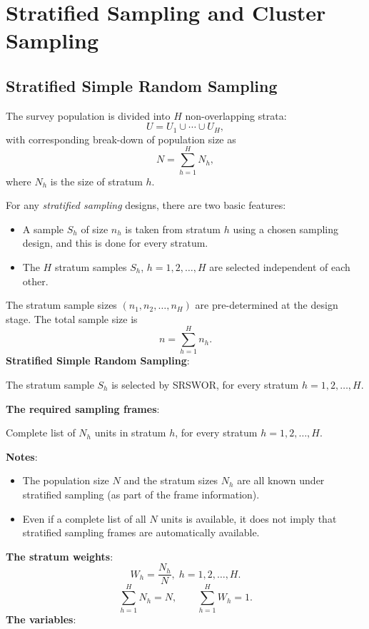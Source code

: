 \chapter{Stratified Sampling and Cluster Sampling}
\section{Stratified Simple Random Sampling}
The survey population is divided into $H$ non-overlapping strata:
\[ U=U_1\cup \cdots \cup U_H, \]
with corresponding break-down of population size as
\[ N=\sum_{h=1}^{H}N_h, \]
where $ N_h $ is the size of stratum $ h $.

For any \emph{stratified sampling} designs, there are two basic features:
\begin{itemize}
      \item A sample $ S_h $ of size $ n_h $ is taken from stratum $ h $ using
            a chosen sampling design, and this is done for every stratum.
      \item The $ H $ stratum samples $ S_h $, $ h=1,2,\ldots,H $ are selected
            independent of each other.
\end{itemize}

The stratum sample sizes $ (n_1,n_2,\ldots,n_H) $ are pre-determined
at the design stage. The total sample size is
\[ n=\sum_{h=1}^{H}n_h. \]
\textbf{Stratified Simple Random Sampling}:

The stratum sample $ S_h $ is selected by SRSWOR, for every stratum $ h=1,2,\ldots,H $.

\textbf{The required sampling frames}:

Complete list of $ N_h $ units in stratum $ h $, for every stratum $ h=1,2,\ldots,H $.

\textbf{Notes}:
\begin{itemize}
      \item The population size $ N $ and the stratum sizes $ N_h $ are
            all known under stratified sampling (as part of the frame information).
      \item Even if a complete list of all $N$ units is available, it does not
            imply that stratified sampling frames are automatically available.
\end{itemize}

\textbf{The stratum weights}:
\[ W_h=\frac{N_h}{N},\; h=1,2,\ldots,H. \]
\[ \sum_{h=1}^{H}N_h=N,\qquad \sum_{h=1}^{H}W_h=1. \]
\textbf{The variables}:

